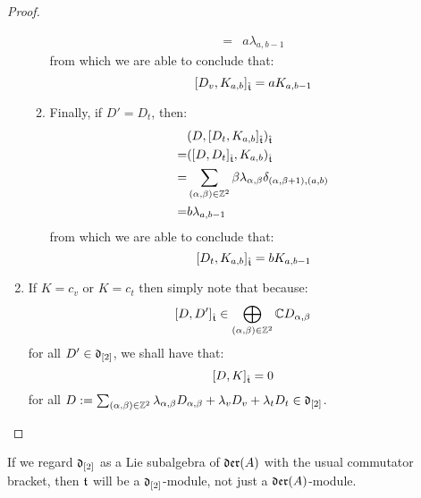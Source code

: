 \begin{proof}
\begin{enumerate}
\begin{enumerate}
$$\begin{aligned}
                                    = & a \lambda_{a, b - 1}
                                \end{aligned}
                            $$
                        from which we are able to conclude that:
                            $$[D_v, K_{a, b}]_{\hat{\mathfrak{t}}} = aK_{a, b - 1}$$   
                        \item Finally, if $D' = D_t$, then:
                            $$
                                \begin{aligned}
                                    & ( D, [D_t, K_{a, b}]_{\hat{\mathfrak{t}}} )_{\hat{\mathfrak{t}}}
                                    \\
                                    = & ( [D, D_t]_{\hat{\mathfrak{t}}}, K_{a, b} )_{\hat{\mathfrak{t}}}
                                    \\
                                    = & \sum_{(\alpha, \beta) \in \mathbb{Z}^2} \beta \lambda_{\alpha, \beta} \delta_{(\alpha, \beta + 1), (a, b)} 
                                    \\
                                    = & b \lambda_{a, b - 1}
                                \end{aligned}
                            $$
                        from which we are able to conclude that:
                            $$[D_t, K_{a, b}]_{\hat{\mathfrak{t}}} = b K_{a, b - 1}$$
                    \end{enumerate}
                    \item If $K = c_v$ or $K = c_t$ then simply note that because:
                        $$[D, D']_{\hat{\mathfrak{t}}} \in \bigoplus_{(\alpha, \beta) \in \mathbb{Z}^2} \mathbb{C} D_{\alpha, \beta}$$
                    for all $D' \in \mathfrak{d}_{[2]}$, we shall have that:
                        $$[D, K]_{\hat{\mathfrak{t}}} = 0$$
                    for all $D := \sum_{(\alpha, \beta) \in \mathbb{Z}^2} \lambda_{\alpha, \beta} D_{\alpha, \beta} + \lambda_v D_v + \lambda_t D_t \in \mathfrak{d}_{[2]}$.
                \end{enumerate}
            \end{proof}
        
        \begin{proposition} \label{prop: toroidal_lie_algebras_as_modules_over_div_0_vector_field_lie_algebras}
            If we regard $\mathfrak{d}_{[2]}$ as a Lie subalgebra of $\mathfrak{der}(A)$ with the usual commutator bracket, then $\mathfrak{t}$ will be a $\mathfrak{d}_{[2]}$-module, not just a $\mathfrak{der}(A)$-module.
        \end{proposition}
        
